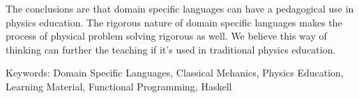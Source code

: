 The conclusions are that domain specific languages can have a pedagogical use in
physics education. The rigorous nature of domain specific languages
makes the process of physical problem solving rigorous as well. We believe this
way of thinking can further the teaching if it's used in traditional physics
education.













\vfill
Keywords: Domain Specific Languages, Classical Mehanics, Physics Education, Learning Material, Functional Programming, Haskell


\newpage				%
\thispagestyle{empty}
\mbox{}
